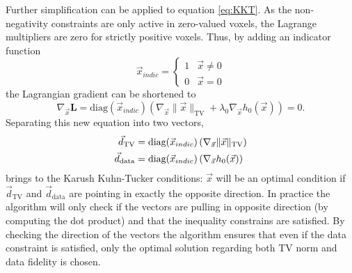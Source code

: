 Further simplification can be applied to equation \ref{eq:KKT}. As the non-negativity constraints are only active in zero-valued voxels, the Lagrange multipliers are zero for strictly positive voxels. Thus, by adding an indicator function
\begin{equation}
\vec{x}_{indic}=
\begin{cases}
1 & \vec{x} \neq 0 \\
0 & \vec{x} = 0 
\end{cases}
\end{equation}
the Lagrangian gradient can be shortened to
\begin{equation}
\nabla_{\vec{x}}\textbf{L}=\text{diag}(\vec{x}_{indic})\left(\nabla_{\vec{x}}\lVert \vec{x} \rVert_\text{TV}+\lambda_0\nabla_{\vec{x}}h_0(\vec{x})\right)=0 .\label{eq:KKT2}
\end{equation}
Separating this new equation into two vectors,
\begin{align}
\vec{d}_{\text{TV}}&=\text{diag}(\vec{x}_{indic})\left(\nabla_{\vec{x}}\lVert \vec{x} \rVert_\text{TV}\right)\notag\\ 
\vec{d}_{\text{data}}&=\text{diag}(\vec{x}_{indic})\left(\nabla_{\vec{x}}h_0(\vec{x})\right)
\label{eq:KKTvectors}
\end{align}
brings to the Karush Kuhn-Tucker conditions: $\vec{x}$ will be an optimal condition if $\vec{d}_{\text{TV}}$ and $\vec{d}_{\text{data}}$ are pointing in exactly the opposite direction. In practice the algorithm will only check if the vectors are pulling in opposite direction (by computing the dot product) and that the inequality constrains are satisfied. By checking the direction of the vectors the algorithm ensures that even if the data constraint is satisfied, only the optimal solution regarding both TV norm and data fidelity is chosen.


